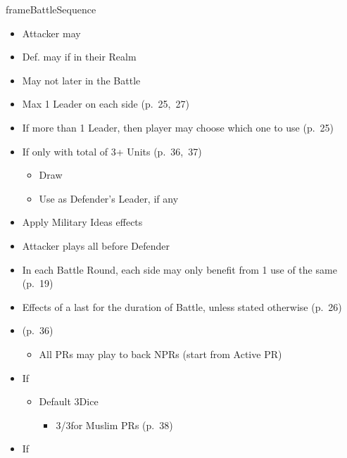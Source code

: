 \documentclass[10pt]{article}
\newlength{\fhBattleSequence} \setlength\fhBattleSequence{31\baselineskip}
\begin{document}
\begin{dynamiccontents*}{frameBattleSequence}
\begin{eubox}{\fhBattleSequence}
\begin{multicols}{3}
\begin{itemize}
\begin{itemize}
{\begin{itemize}
				\end{itemize}
				}
			\end{itemize}
			\item Attacker may 
			\item Def. may  if in their Realm
			\item May not  later in the Battle
			\item Max 1 Leader on each side (p.~25,~27)
			\item If more than 1 Leader, then player may choose which one to use (p.~25)
			\item If only  with total of 3+ Units (p.~36,~37)
			\begin{itemize}
				\item Draw \milcard
				\item Use as Defender's Leader, if any
			\end{itemize}
			\item Apply Military Ideas effects
		\end{itemize}
		\begin{itemize}
			\item Attacker plays all \battleactions before Defender
			\item In each Battle Round, each side may only benefit from 1 use of the same \battleaction (p.~19)
			\item Effects of a \battleaction last for the duration of Battle, unless stated otherwise (p.~26)
			\item {} (p.~36)
			\begin{itemize}
				\item All PRs may play \battleactions to back NPRs (start from Active PR)
			\end{itemize}
		\end{itemize}
		\begin{itemize}
			\item If 
			\begin{itemize}
				\item Default 3\infantry Dice
				\begin{itemize}
					\item 3\infantry/3\cavalry for Muslim PRs (p.~38)
				\end{itemize}
			\end{itemize}
			\item If 

\end{itemize}
\end{multicols}
\end{eubox}
\end{dynamiccontents*}
\end{document}
